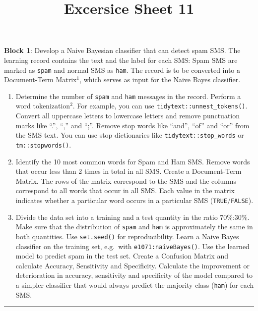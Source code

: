 \documentclass[11pt,]{article}
\title{Excersice Sheet 11}
\author{}
\date{}
\providecommand{\tightlist}{%
  \setlength{\itemsep}{0pt}\setlength{\parskip}{0pt}}
\begin{document}
\maketitle

\textbf{Block 1}: Develop a Naive Bayesian classifier that can detect
spam SMS. The learning record contains the text and the label for each
SMS: Spam SMS are marked as \texttt{spam} and normal SMS as
\texttt{ham}. The record is to be converted into a Document-Term
Matrix\(^1\), which serves as input for the Naive Bayes classifier.

\begin{enumerate}
\def\labelenumi{\arabic{enumi}.}
\tightlist
\item
  Determine the number of \texttt{spam} and \texttt{ham} messages in the
  record. Perform a word tokenization\(^2\). For example, you can use
  \texttt{tidytext::unnest\_tokens()}. Convert all uppercase letters to
  lowercase letters and remove punctuation marks like ``.'', ``,'' and
  ``;''. Remove stop words like ``and'', ``of'' and ``or'' from the SMS
  text. You can use stop dictionaries like
  \texttt{tidytext::stop\_words} or \texttt{tm::stopwords()}.
\item
  Identify the 10 most common words for Spam and Ham SMS. Remove words
  that occur less than 2 times in total in all SMS. Create a
  Document-Term Matrix. The rows of the matrix correspond to the SMS and
  the columns correspond to all words that occur in all SMS. Each value
  in the matrix indicates whether a particular word occurs in a
  particular SMS (\texttt{TRUE}/\texttt{FALSE}).
\item
  Divide the data set into a training and a test quantity in the ratio
  70\%:30\%. Make sure that the distribution of \texttt{spam} and
  \texttt{ham} is approximately the same in both quantities. Use
  \texttt{set.seed()} for reproducibility. Learn a Naive Bayes
  classifier on the training set, e.g.~with \texttt{e1071:naiveBayes()}.
  Use the learned model to predict spam in the test set. Create a
  Confusion Matrix and calculate Accuracy, Sensitivity and Specificity.
  Calculate the improvement or deterioration in accuracy, sensitivity
  and specificity of the model compared to a simpler classifier that
  would always predict the majority class (\texttt{ham}) for each SMS.
\end{enumerate}

\begin{center}\rule{0.5\linewidth}{\linethickness}\end{center}
\end{document}
